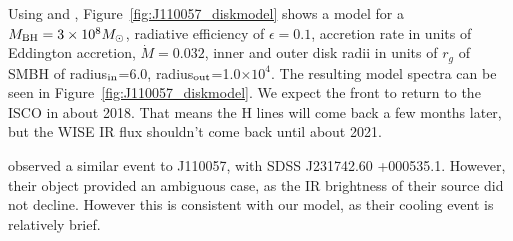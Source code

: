 \documentclass{nature}
\begin{document}
Using \citet{Ford2018} and \citet{Sirko_Goodman2003},
Figure~\ref{fig:J110057_diskmodel} shows a model for a $M_{\rm
BH}=3\times 10^{8} M_{\odot}$, radiative efficiency of $\epsilon=0.1$,
accretion rate in units of Eddington accretion, $\dot{M}=0.032$, inner
and outer disk radii in units of $r_g$ of SMBH of radius$_{\rm
in}$=6.0, radius$_{\rm out}$=1.0$\times 10^{4}$. The resulting model
spectra can be seen in Figure~\ref{fig:J110057_diskmodel}.  We expect
the front to return to the ISCO in about 2018. That means the H lines
will come back a few months later, but the WISE IR flux shouldn't come
back until about 2021.

\cite{Guo2016} observed a similar event to J110057, with SDSS J231742.60
+000535.1. However, their object provided an ambiguous case, as the IR
brightness of their source did not decline. However this is consistent
with our model, as their cooling event is relatively brief.





%
%
\end{document}
